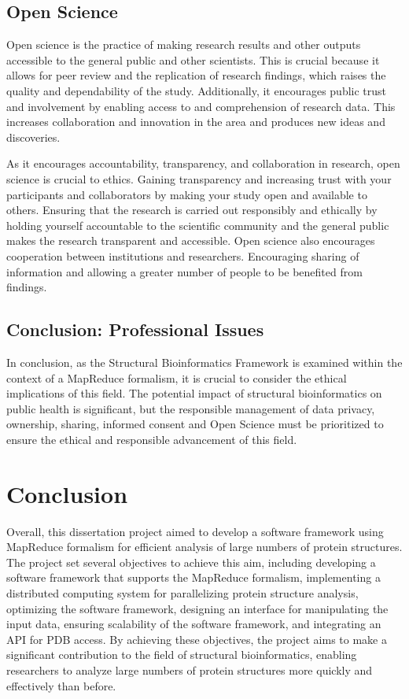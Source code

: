 \documentclass[]{final_report}
\begin{document}
\subsection{Open Science}

Open science is the practice of making research results and other outputs accessible to the general public and other scientists. This is crucial because it allows for peer review and the replication of research findings, which raises the quality and dependability of the study. Additionally, it encourages public trust and involvement by enabling access to and comprehension of research data. This increases collaboration and innovation in the area and produces new ideas and discoveries.

As it encourages accountability, transparency, and collaboration in research, open science is crucial to ethics. Gaining transparency and increasing trust with your participants and collaborators by making your study open and available to others. Ensuring that the research is carried out responsibly and ethically by holding yourself accountable to the scientific community and the general public makes the research transparent and accessible. Open science also encourages cooperation between institutions and researchers. Encouraging sharing of information and allowing a greater number of people to be benefited from findings.

\subsection{Conclusion: Professional Issues}
In conclusion, as the Structural Bioinformatics Framework is examined within the context of a MapReduce formalism, it is crucial to consider the ethical implications of this field. The potential impact of structural bioinformatics on public health is significant, but the responsible management of data privacy, ownership, sharing, informed consent and Open Science must be prioritized to ensure the ethical and responsible advancement of this field.

\section{Conclusion}
Overall, this dissertation project aimed to develop a software framework using MapReduce formalism for efficient analysis of large numbers of protein structures. The project set several objectives to achieve this aim, including developing a software framework that supports the MapReduce formalism, implementing a distributed computing system for parallelizing protein structure analysis, optimizing the software framework, designing an interface for manipulating the input data, ensuring scalability of the software framework, and integrating an API for PDB access. By achieving these objectives, the project aims to make a significant contribution to the field of structural bioinformatics, enabling researchers to analyze large numbers of protein structures more quickly and effectively than before.
\end{document}
